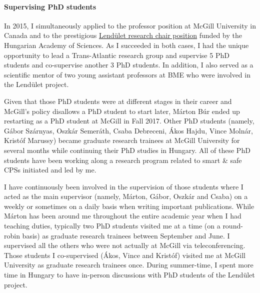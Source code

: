 \paragraph{Supervising PhD students}
In 2015, I simultaneously applied to the professor position at McGill University in Canada and to the prestigious 
\href{https://mta.hu/lendulet}{Lendület research chair position} funded by the Hungarian Academy of Sciences. 
As I succeeded in both cases, I had the unique opportunity to lead a Trans-Atlantic research group and supervise 5 PhD 
students and co-supervise another 3 PhD students.  In addition, I also served as a scientific mentor of two young assistant 
professors at BME who were involved in the Lendület project.

Given that those PhD students were at different stages in their career and McGill's policy disallows a PhD student to start 
later, Márton Búr ended up restarting as a PhD student at McGill in Fall 2017. Other PhD students (namely, Gábor 
Szárnyas, Oszkár Semeráth, Csaba Debreceni, Ákos Hajdu, Vince Molnár, Kristóf Marussy) became graduate research 
trainees at McGill University for several months while continuing their PhD studies in Hungary. 
All of these PhD students have been working along a research program 
related to smart \& safe CPSs initiated and led by me.

I have continuously been involved in the supervision of those students where I acted as the main supervisor (namely, 
Márton, Gábor, Oszkár and Csaba) on a weekly or sometimes on a daily basis when writing important publications. While 
Márton has been around me throughout the entire academic year when I had teaching duties, typically two PhD students 
visited me at a time (on a round-robin basis) as graduate research trainees between September and June. I supervised all the others who were not actually at McGill via 
teleconferencing. Those students I co-supervised (Ákos, Vince and Kristóf) visited me at McGill University as graduate 
research trainees once. During summer-time, I spent more time in Hungary to have in-person discussions with PhD students of the Lendület project.



